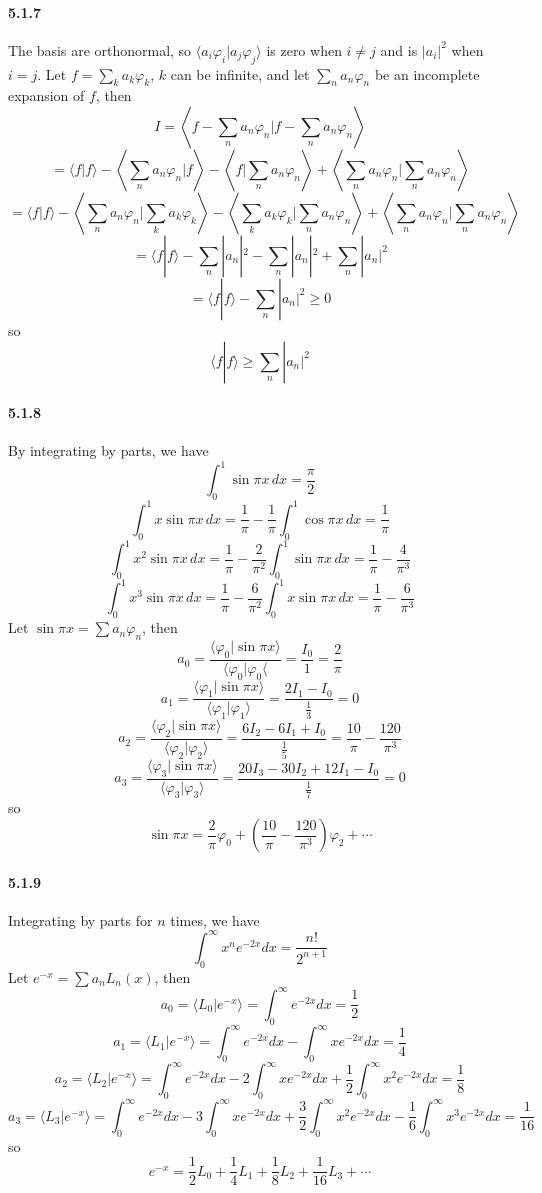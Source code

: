 \documentclass[a4paper]{article}
\begin{document}
\paragraph{5.1.7}
The basis are orthonormal, so $\langle a_i\varphi_i|a_j\varphi_j \rangle$ is zero when $i\neq j$ and is $|a_i|^2$ when $i=j$. Let $f=\sum_ka_k\varphi_k$, $k$ can be infinite, and let $\sum_na_n\varphi_n$ be an incomplete expansion of $f$, then 
\[
I=\left\langle f-\sum_na_n\varphi_n\Big|f-\sum_na_n\varphi_n \right\rangle
\]
\[
=\langle f|f \rangle-\left\langle \sum_na_n\varphi_n\Big|f \right\rangle-\left\langle f\Big|\sum_na_n\varphi_n \right\rangle+\left\langle \sum_na_n\varphi_n\Big|\sum_na_n\varphi_n \right\rangle
\]
\[
=\langle f|f \rangle-\left\langle \sum_na_n\varphi_n\Big|\sum_ka_k\varphi_k \right\rangle-\left\langle \sum_ka_k\varphi_k\Big|\sum_na_n\varphi_n \right\rangle+\left\langle \sum_na_n\varphi_n\Big|\sum_na_n\varphi_n \right\rangle
\]
\[
=\langle f|f \rangle-\sum_n|a_n|^2-\sum_n|a_n|^2+\sum_n|a_n|^2
\]
\[
=\langle f|f \rangle-\sum_n|a_n|^2\geq0
\]
so
\[
\langle f|f \rangle\geq\sum_n|a_n|^2
\]

\paragraph{5.1.8}
By integrating by parts, we have
\[
\int_0^1\sin\pi x\,dx=\frac{\pi}{2}
\]
\[
\int_0^1x\sin\pi x\,dx=\frac{1}{\pi}-\frac{1}{\pi}\int_0^1\cos\pi x\,dx=\frac{1}{\pi}
\]
\[
\int_0^1x^2\sin\pi x\,dx=\frac{1}{\pi}-\frac{2}{\pi^2}\int_0^1\sin\pi x\,dx=\frac{1}{\pi}-\frac{4}{\pi^3}
\]
\[
\int_0^1x^3\sin\pi x\,dx=\frac{1}{\pi}-\frac{6}{\pi^2}\int_0^1x\sin\pi x\,dx=\frac{1}{\pi}-\frac{6}{\pi^3}
\]
Let $\sin\pi x=\sum a_n\varphi_n$, then 
\[
a_0=\frac{\langle\varphi_0|\sin\pi x\rangle}{\langle\varphi_0|\varphi_0\langle}=\frac{I_0}{1}=\frac{2}{\pi}
\]
\[
a_1=\frac{\langle\varphi_1|\sin\pi x\rangle}{\langle\varphi_1|\varphi_1\rangle}=\frac{2I_1-I_0}{\frac{1}{3}}=0
\]
\[
a_2=\frac{\langle\varphi_2|\sin\pi x\rangle}{\langle\varphi_2|\varphi_2\rangle}=\frac{6I_2-6I_1+I_0}{\frac{1}{5}}=\frac{10}{\pi}-\frac{120}{\pi^3}
\]
\[
a_3=\frac{\langle\varphi_3|\sin\pi x\rangle}{\langle\varphi_3|\varphi_3\rangle}=\frac{20I_3-30I_2+12I_1-I_0}{\frac{1}{7}}=0
\]
so
\[
\sin\pi x=\frac{2}{\pi}\varphi_0+(\frac{10}{\pi}-\frac{120}{\pi^3})\varphi_2+\cdots
\]

\paragraph{5.1.9}
Integrating by parts for $n$ times, we have
\[
\int_0^\infty x^ne^{-2x}dx=\frac{n!}{2^{n+1}}
\]
Let $e^{-x}=\sum a_nL_n(x)$, then 
\[
a_0=\langle L_0|e^{-x}\rangle=\int_0^\infty e^{-2x}dx=\frac{1}{2}
\]
\[
a_1=\langle L_1|e^{-x}\rangle=\int_0^\infty e^{-2x}dx-\int_0^\infty xe^{-2x}dx=\frac{1}{4}
\]
\[
a_2=\langle L_2|e^{-x}\rangle=\int_0^\infty e^{-2x}dx-2\int_0^\infty xe^{-2x}dx+\frac{1}{2}\int_0^\infty x^2e^{-2x}dx=\frac{1}{8}
\]
\[
a_3=\langle L_3|e^{-x}\rangle=\int_0^\infty e^{-2x}dx-3\int_0^\infty xe^{-2x}dx+\frac{3}{2}\int_0^\infty x^2e^{-2x}dx-\frac{1}{6}\int_0^\infty x^3e^{-2x}dx=\frac{1}{16}
\]
so
\[
e^{-x}=\frac{1}{2}L_0+\frac{1}{4}L_1+\frac{1}{8}L_2+\frac{1}{16}L_3+\cdots
\]
\end{document}
